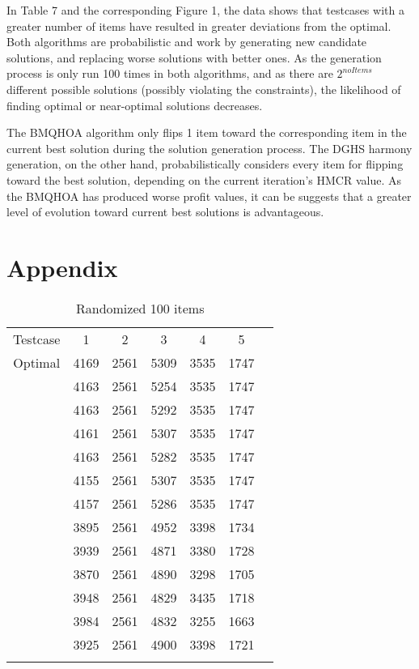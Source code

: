 \documentclass[titlepage]{article}
\begin{document}
In Table 7 and the corresponding Figure 1, the data shows that testcases with a greater number of items have resulted in greater deviations from the optimal. Both algorithms are probabilistic and work by generating new candidate solutions, and replacing worse solutions with better ones. As the generation process is only run 100 times in both algorithms, and as there are $2^{noItems}$ different possible solutions (possibly violating the constraints), the likelihood of finding optimal or near-optimal solutions decreases.

The BMQHOA algorithm only flips 1 item toward the corresponding item in the current best solution during the solution generation process. The DGHS harmony generation, on the other hand, probabilistically considers every item for flipping toward the best solution, depending on the current iteration's HMCR value.  As the BMQHOA has produced worse profit values, it can be suggests that a greater level of evolution toward current best solutions is advantageous. 

\newpage





\section{Appendix}
\begin{table}[!h]\centering
    \caption{Randomized 100 items} \label{random100}
    \begin{tabu}{|c|c|c|c|c|c|c|}
        Testcase & 1 & 2 & 3 & 4 & 5 \\ [-1pt]  
        Optimal & 4169 & 2561 & 5309 & 3535 & 1747 \\ [-1pt]  
         & 4163 & 2561 & 5254 & 3535 & 1747 \\ 
        & 4163 & 2561 &5292 &3535 &1747 \\  
        &4161 &2561 &5307 &3535 &1747 \\  
        &4163 &2561 &5282 &3535 &1747 \\  
        &4155 &2561 &5307 &3535 &1747 \\  
        &4157 &2561 &5286 &3535 &1747 \\[-1pt] 
         &3895 &2561 &4952 &3398 &1734 \\ 
        &3939 &2561 &4871 &3380 &1728 \\ 
        &3870 &2561 &4890 &3298 &1705 \\ 
        &3948 &2561 &4829 &3435 &1718 \\ 
        &3984 &2561 &4832 &3255 &1663 \\ 
        &3925 &2561 &4900 &3398 &1721 \\[-1pt] 
    \end{tabu}
\end{table}
\end{document}
